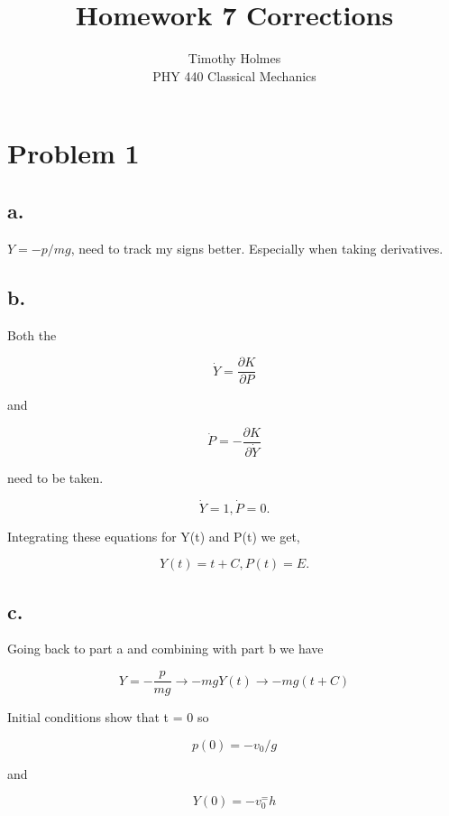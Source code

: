 \documentclass[12pt]{article}
\begin{document}
 
 
\title{Homework 7 Corrections}
\author{Timothy Holmes\\ %
PHY 440 Classical Mechanics}

\maketitle

\section*{Problem 1}

\subsection*{a.}

$Y = -p/mg$, need to track my signs better. Especially when taking derivatives.

\subsection*{b.}

Both the 

$$
\dot{Y} = \frac{\partial K}{\partial P}
$$

and

$$
\dot{P} = -\frac{\partial K}{\partial \dot{Y}}
$$

need to be taken.

$$
\dot{Y} = 1, \dot{P} = 0.
$$

Integrating these equations for Y(t) and P(t) we get,

$$
Y(t) = t + C, P(t) = E.
$$

\subsection*{c.}

Going back to part a and combining with part b we have 

$$
Y = -\frac{p}{mg} \rightarrow -mgY(t) \rightarrow -mg(t + C)
$$

Initial conditions show that t = 0 so

$$
p(0) = -v_{0}/g
$$

and 

$$
Y(0) = -v_{0}^ = h
$$
\end{document}
